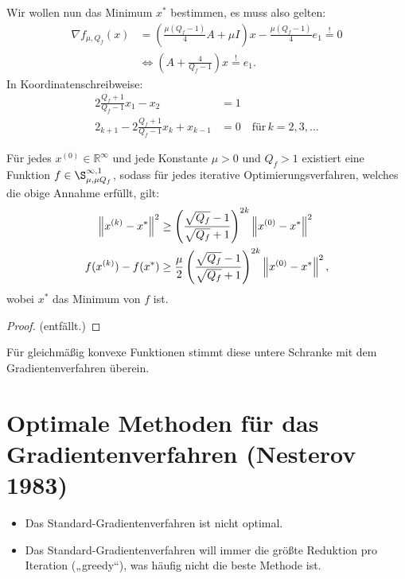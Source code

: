 Wir wollen nun das Minimum $x^*$ bestimmen, es muss also gelten:
\begin{align*}
\nabla f_{\mu, Q_f}(x) &= \left( \frac{\mu(Q_f-1)}{4} A + \mu I\right) x - \frac{\mu(Q_f - 1)}{4}e_1 \overset{!}{=} 0\\
&\Leftrightarrow \left(A + \frac{4}{Q_f -1}\right)x \overset{!}{=} e_1.
\end{align*}
In Koordinatenschreibweise:
\begin{align*}
2\frac{Q_f + 1}{Q_f -1}x_1 - x_2 &= 1\\
2_{k+1} - 2 \frac{Q_f + 1}{Q_f - 1}x_k + x_{k-1} &= 0 \quad \text{für}\, k = 2, 3,…
\end{align*} %

\begin{Theorem}
Für jedes $x^{(0)} \in \mathbb{R}^\infty$ und jede Konstante $\mu > 0$ und $Q_f > 1$ existiert eine Funktion $f \in \S_{\mu, \mu Q_f}^{\infty, 1}$, sodass für jedes iterative Optimierungsverfahren, welches die obige Annahme erfüllt, gilt:
\begin{align*}
\left\lVert x^{(k)} - x^*\right\rVert^2 &\geq \left(\frac{\sqrt{Q_f} - 1}{\sqrt{Q_f} + 1}\right)^{2k} \left\lVert x^{(0)} - x^*\right\rVert^2\\
f(x^{(k)}) - f(x^*) &\geq \frac{\mu}{2} \left(\frac{\sqrt{Q_f} - 1}{\sqrt{Q_f} + 1}\right)^{2k} \left\lVert x^{(0)} - x^*\right\rVert^2,
\end{align*}
wobei $x^*$ das Minimum von $f$ ist.
\end{Theorem}
\begin{proof}
(entfällt.)
\end{proof}
\begin{Bemerkung}
Für gleichmäßig konvexe Funktionen stimmt diese untere Schranke mit dem Gradientenverfahren überein.
\end{Bemerkung}

\section{Optimale Methoden für das Gradientenverfahren (Nesterov 1983)}
\begin{itemize}
\item Das Standard-Gradientenverfahren ist nicht optimal.
\item Das Standard-Gradientenverfahren will immer die größte Reduktion pro Iteration („greedy“), was häufig nicht die beste Methode ist.
\end{itemize}

